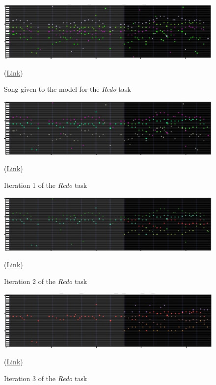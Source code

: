 \documentclass[12pt]{report}
\begin{document}
\begin{figure}[htbp]
    \centering
    \includegraphics[width=\textwidth]{images/generated_midis/tasks/redo/task-redo-truth.jpg}
    \caption{Song given to the model for the \textit{Redo} task}
    (\href{https://github.com/ValentinVignal/midiGenerator/blob/master/samples/tasks/redo_truth.mid}{Link})
    \label{fig:tasks:redo:truth}
\end{figure}

\begin{figure}[htbp]
    \centering
    \includegraphics[width=\textwidth]{images/generated_midis/tasks/redo/task-redo-0.jpg}
    \caption{Iteration 1 of the \textit{Redo} task}
    (\href{https://github.com/ValentinVignal/midiGenerator/blob/master/samples/tasks/redo_0_(inst_2).mid}{Link})
    \label{fig:tasks:redo:0}
\end{figure}

\begin{figure}[htbp]
    \centering
    \includegraphics[width=\textwidth]{images/generated_midis/tasks/redo/task-redo-1.jpg}
    \caption{Iteration 2 of the \textit{Redo} task}
    (\href{https://github.com/ValentinVignal/midiGenerator/blob/master/samples/tasks/redo_1_(inst_3).mid}{Link})
    \label{fig:tasks:redo:1}
\end{figure}

\begin{figure}[htbp]
    \centering
    \includegraphics[width=\textwidth]{images/generated_midis/tasks/redo/task-redo-2.jpg}
    \caption{Iteration 3 of the \textit{Redo} task}
    (\href{https://github.com/ValentinVignal/midiGenerator/blob/master/samples/tasks/redo_2_(inst_0).mid}{Link})
    \label{fig:tasks:redo:2}
\end{figure}
\end{document}
